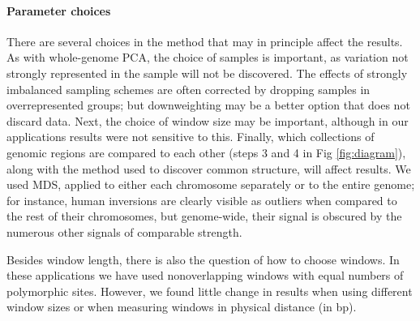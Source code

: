 \documentclass[11pt, oneside]{article}   	%
\newcommand\citep{\cite}
\newcommand{\Figure}{Fig }
\newcommand{\Figure}{{Figure }}
\begin{document}
% 

\paragraph{Parameter choices}
There are several choices in the method that may in principle affect the results.
As with whole-genome PCA,
the choice of samples is important,
as variation not strongly represented in the sample will not be discovered.
The effects of strongly imbalanced sampling schemes are often corrected by dropping samples in overrepresented groups;
but downweighting may be a better option that does not discard data.
Next, the choice of window size may be important,
although in our applications results were not sensitive to this.
Finally, which collections of genomic regions are compared to each other (steps 3 and 4 in \Figure \ref{fig:diagram}),
along with the method used to discover common structure,
will affect results.
We used MDS, applied to either each chromosome separately or to the entire genome;
for instance, human inversions are clearly visible as outliers when compared to the rest of their chromosomes,
but genome-wide, their signal is obscured by the numerous other signals of comparable strength.

Besides window length, there is also the question of how to choose windows.
In these applications we have used nonoverlapping windows with equal numbers of polymorphic sites.
However, we found little change in results when using different window sizes
or when measuring windows in physical distance (in bp).
\end{document}

